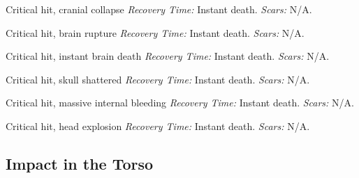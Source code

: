 \begin{description}[labelwidth=1.5em, leftmargin=*, itemsep=0.4em]
    \item[15 -] Critical hit, cranial collapse \textit{Recovery Time:} Instant death. \textit{Scars:} N/A.
    \item[16 -] Critical hit, brain rupture \textit{Recovery Time:} Instant death. \textit{Scars:} N/A.
    \item[17 -] Critical hit, instant brain death \textit{Recovery Time:} Instant death. \textit{Scars:} N/A.
    \item[18 -] Critical hit, skull shattered \textit{Recovery Time:} Instant death. \textit{Scars:} N/A.
    \item[19 -] Critical hit, massive internal bleeding \textit{Recovery Time:} Instant death. \textit{Scars:} N/A.
    \item[20 -] Critical hit, head explosion \textit{Recovery Time:} Instant death. \textit{Scars:} N/A.
\end{description}

\subsection{Impact in the Torso}

